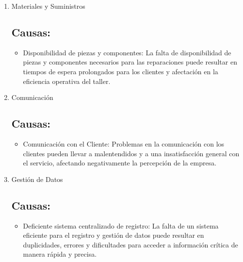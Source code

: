 \begin{enumerate}
    \item Materiales y Suministros
    \subsection{Causas:}
    \begin{itemize}
        \item Disponibilidad de piezas y componentes: La falta de disponibilidad de piezas y componentes necesarios para las reparaciones puede resultar en tiempos de espera prolongados para los clientes y afectación en la eficiencia operativa del taller.
    \end{itemize}

    \item Comunicación
    \subsection{Causas:}
    \begin{itemize}
        \item Comunicación con el Cliente: Problemas en la comunicación con los clientes pueden llevar a malentendidos y a una insatisfacción general con el servicio, afectando negativamente la percepción de la empresa.
    \end{itemize}

    \item Gestión de Datos
    \subsection{Causas:}
    \begin{itemize}
        \item Deficiente sistema centralizado de registro: La falta de un sistema eficiente para el registro y gestión de datos puede resultar en duplicidades, errores y dificultades para acceder a información crítica de manera rápida y precisa.
    \end{itemize}

\end{enumerate}


